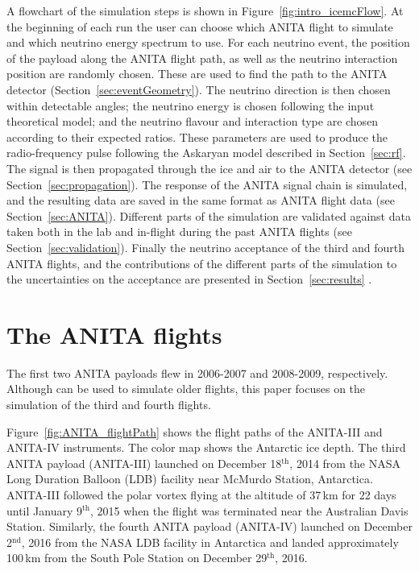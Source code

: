 A flowchart of the \icemc simulation steps is shown in Figure~\ref{fig:intro_icemcFlow}.
At the beginning of each run the user can choose which ANITA flight to simulate and which neutrino energy spectrum to use.
For each neutrino event, the position of the payload along the ANITA flight path, as well as the neutrino interaction position are randomly chosen.
These are used to find the path to the ANITA detector (Section~\ref{sec:eventGeometry}). %
The neutrino direction is then chosen within detectable angles; the neutrino energy is chosen following the input theoretical model; and the neutrino flavour and interaction type are chosen according to their expected ratios. 
These parameters are used to produce the radio-frequency pulse following the Askaryan model described in Section~\ref{sec:rf}.
The signal is then propagated through the ice and air to the ANITA
detector (see Section~\ref{sec:propagation}). 
The response of the ANITA signal chain is simulated, and the resulting 
data are saved in the same format as ANITA flight data 
(see Section~\ref{sec:ANITA}).
Different parts of the simulation are validated against data taken both in
the lab and in-flight during the past ANITA flights (see
Section~\ref{sec:validation}).
Finally the neutrino acceptance of the third and fourth ANITA flights, and
the contributions of the different parts of the simulation to the uncertainties on the acceptance are presented in Section~\ref{sec:results} .



\section{The ANITA flights}
\label{sec:anita3}
The first two ANITA payloads flew in 2006-2007\cite{ANITA1paper} and 2008-2009\cite{ANITA2paper,ANITA2erratum}, respectively.
Although \icemc can be used to simulate older flights, this paper focuses on the simulation of the third and fourth flights.

Figure~\ref{fig:ANITA_flightPath} shows the flight paths of the ANITA-III and ANITA-IV instruments. 
The color map shows the Antarctic ice depth. 
The third ANITA payload (ANITA-III) launched on December 18$^{\text{th}}$, 2014 from the
NASA Long Duration Balloon (LDB) facility near McMurdo Station, Antarctica.
ANITA-III followed the polar vortex flying at the altitude of 37\,km for
22 days until January 9$^{\text{th}}$, 2015 when the flight was terminated
near the Australian Davis Station.
Similarly, the fourth ANITA payload (ANITA-IV) launched on December 2$^{\text{nd}}$, 2016 from the NASA LDB facility in Antarctica and landed approximately 100\,km from the South Pole Station on December 29$^{\text{th}}$, 2016.



